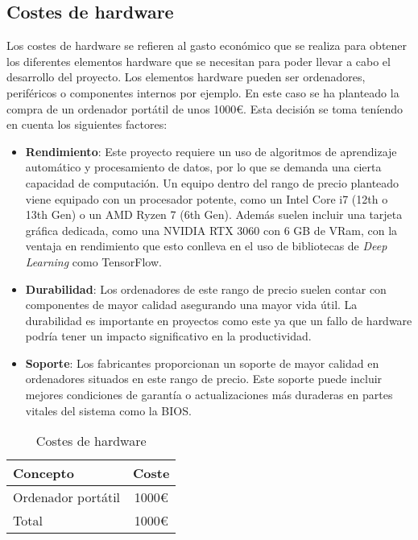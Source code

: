 \subsection{Costes de hardware}
Los costes de hardware se refieren al gasto económico que se realiza para obtener los diferentes elementos hardware que se necesitan para poder llevar a cabo el desarrollo del proyecto. Los elementos hardware pueden ser ordenadores, periféricos o componentes internos por ejemplo.
En este caso se ha planteado la compra de un ordenador portátil de unos 1000€. Esta decisión se toma teníendo en cuenta los siguientes factores:

\begin{itemize}
\tightlist
\item \textbf{Rendimiento}: Este proyecto requiere un uso de algoritmos de aprendizaje automático y procesamiento de datos, por lo que se demanda una cierta capacidad de computación. 
Un equipo dentro del rango de precio planteado viene equipado con un procesador potente, como un Intel Core i7 (12th o 13th Gen) o un AMD Ryzen 7 (6th Gen). Además suelen incluir una tarjeta gráfica dedicada, como una NVIDIA RTX 3060 con 6 GB de VRam, con la ventaja en rendimiento que esto conlleva en el uso de bibliotecas de \textit{Deep Learning} como TensorFlow.

\item \textbf{Durabilidad}: Los ordenadores de este rango de precio suelen contar con componentes de mayor calidad asegurando una mayor vida útil. La durabilidad es importante en proyectos como este ya que un fallo de hardware podría tener un impacto significativo en la productividad.

\item \textbf{Soporte}: Los fabricantes proporcionan un soporte de mayor calidad en ordenadores situados en este rango de precio. Este soporte puede incluir mejores condiciones de garantía o actualizaciones más duraderas en partes vitales del sistema como la BIOS.
\end{itemize}

\begin{table}[h]
\centering
\begin{tabular}{|l|c|}
\hline
\textbf{Concepto} & \textbf{Coste} \\ 
\hline
Ordenador portátil & 1000€ \\ 
\hline
Total & 1000€ \\ 
\hline
\end{tabular}
\caption{Costes de hardware}
\end{table}

